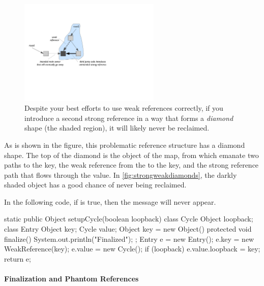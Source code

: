 \begin{figure}[h]   %
\centering
	\includegraphics[width=0.6\textwidth]{part4/Figures/lifetime/strongweakdiamonds}
	\caption{Despite your best efforts to use weak references correctly, if you
	introduce a second strong reference in a way that forms a
	\emph{diamond} shape (the shaded region), it will likely never be reclaimed.}
	\label{fig:strongweakdiamonds}
\end{figure}

As is shown in the figure, this problematic reference structure has a diamond
shape. The top of the diamond is the  object of the map, from which
emanate two paths to the key, the weak reference from the  to the
key, and the strong reference path that flows through the value. In
\autoref{fig:strongweakdiamonds}, the darkly shaded object has a good chance of
never being reclaimed. 

In the following code, if  is true, then the 
message will never appear.
\begin{shortlisting}
static public Object setupCycle(boolean loopback) {
   class Cycle {
       Object loopback;
   }
   class Entry {
       Object key;
       Cycle value;
   }
   Object key = new Object() {
           protected void finalize() {
               System.out.println("Finalized");
           }
       };
   Entry e = new Entry();
   e.key = new WeakReference(key);
   e.value = new Cycle();
   if (loopback) e.value.loopback = key;
   return e;
}
\end{shortlisting}

\paragraph{Finalization and Phantom References}

